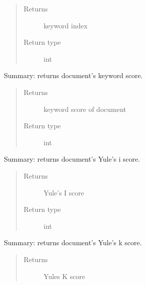 \documentclass[letterpaper,10pt,english]{sphinxmanual}
\begin{document}
\begin{fulllineitems}
\begin{fulllineitems}
\begin{quote}
\begin{description}
\item[{Returns}] \leavevmode
keyword index

\item[{Return type}] \leavevmode
int

\end{description}\end{quote}

\end{fulllineitems}


\begin{fulllineitems}
\label{\detokenize{KeywordList:KeywordList.KeywordList.getkeywordscore}}
Summary: returns document’s keyword score.
\begin{quote}\begin{description}
\item[{Returns}] \leavevmode
keyword score of document

\item[{Return type}] \leavevmode
int

\end{description}\end{quote}

\end{fulllineitems}


\begin{fulllineitems}
\label{\detokenize{KeywordList:KeywordList.KeywordList.getyulesiscore}}
Summary: returns document’s Yule’s i score.
\begin{quote}\begin{description}
\item[{Returns}] \leavevmode
Yule’s I score

\item[{Return type}] \leavevmode
int

\end{description}\end{quote}

\end{fulllineitems}


\begin{fulllineitems}
\label{\detokenize{KeywordList:KeywordList.KeywordList.getyuleskscore}}
Summary: returns document’s Yule’s k score.
\begin{quote}\begin{description}
\item[{Returns}] \leavevmode
Yules K score


\end{description}
\end{quote}
\end{fulllineitems}
\end{fulllineitems}
\end{document}
